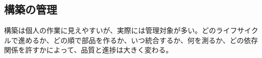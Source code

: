 \subsection{構築の管理}

構築は個人の作業に見えやすいが、実際には管理対象が多い。どのライフサイクルで進めるか、どの順で部品を作るか、いつ統合するか、何を測るか、どの依存関係を許すかによって、品質と進捗は大きく変わる。
